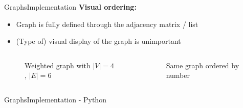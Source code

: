 
\begin{frame}{Graphs}{Implementation}
  \textbf{Visual ordering:}
  \begin{itemize}
    \item
      Graph is fully defined through the
      {\color{Mittel-Blau}adjacency matrix / list}
    \item
      (Type of) visual display of the graph is unimportant
  \end{itemize}
  \begin{columns}
    \begin{column}[b]{0.4\linewidth}
      \begin{figure}[!h]
        \begin{adjustbox}{width=0.8\linewidth}
          
        \end{adjustbox}
        \vspace{-0.75em}
        \caption{Weighted graph with {\color{Mittel-Blau}$\vert V \vert = 4$},
          {\color{Mittel-Blau}$\vert E \vert = 6$}}
      \end{figure}
    \end{column}
    \begin{column}[b]{0.55\linewidth}
      \begin{figure}[!h]
        \begin{adjustbox}{width=0.875\linewidth}
          
        \end{adjustbox}
        \vspace{-0.75em}
        \caption{Same graph ordered by number}
      \end{figure}
    \end{column}
  \end{columns}
\end{frame}


\begin{frame}{Graphs}{Implementation - Python}
  
\end{frame}


